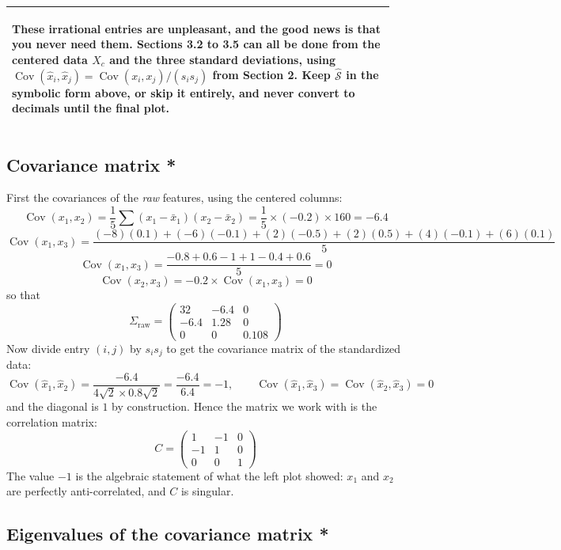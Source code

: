 \documentclass[]{article}
\makeatletter
\newcommand{\Cov}{\operatorname{Cov}}
\newenvironment{simplify}{%
	\par\medskip\noindent
	\begin{tabular}{@{}p{0.965\linewidth}@{}}
		\hline\rule{0pt}{2.6ex}\itshape
}{%
		\\[0.6ex]\hline
	\end{tabular}
	\par\medskip
}
\makeatother
\begin{document}
	\begin{simplify}
		These irrational entries are unpleasant, and the good news is that \textbf{you never need them}.
		Sections 3.2 to 3.5 can all be done from the centered data $X_c$ and the three standard deviations, using $\Cov(\hat{x}_i, \hat{x}_j) = \Cov(x_i, x_j) / (s_i s_j)$ from Section 2.
		Keep $\hat{\mathcal{S}}$ in the symbolic form above, or skip it entirely, and never convert to decimals until the final plot.
	\end{simplify}

	\subsection{Covariance matrix *}

	First the covariances of the \emph{raw} features, using the centered columns:
	$$
	\Cov(x_1, x_2) = \frac{1}{5} \sum (x_1 - \bar{x}_1)(x_2 - \bar{x}_2)
	= \frac{1}{5} \times (-0.2) \times 160 = -6.4
	$$
	$$
	\Cov(x_1, x_3) = \frac{(-8)(0.1) + (-6)(-0.1) + (2)(-0.5) + (2)(0.5) + (4)(-0.1) + (6)(0.1)}{5}
	$$
	$$
	\Cov(x_1, x_3) = \frac{-0.8 + 0.6 - 1 + 1 - 0.4 + 0.6}{5} = 0
	$$
	$$
	\Cov(x_2, x_3) = -0.2 \times \Cov(x_1, x_3) = 0
	$$
	so that
	$$
	\Sigma_{\text{raw}} =
	\begin{pmatrix}
		32 & -6.4 & 0 \\
		-6.4 & 1.28 & 0 \\
		0 & 0 & 0.108
	\end{pmatrix}
	$$
	Now divide entry $(i,j)$ by $s_i s_j$ to get the covariance matrix of the standardized data:
	$$
	\Cov(\hat{x}_1, \hat{x}_2) = \frac{-6.4}{4\sqrt{2} \times 0.8\sqrt{2}} = \frac{-6.4}{6.4} = -1,
	\qquad
	\Cov(\hat{x}_1, \hat{x}_3) = \Cov(\hat{x}_2, \hat{x}_3) = 0
	$$
	and the diagonal is $1$ by construction.
	Hence the matrix we work with is the correlation matrix:
	$$
	C =
	\begin{pmatrix}
		1 & -1 & 0 \\
		-1 & 1 & 0 \\
		0 & 0 & 1
	\end{pmatrix}
	$$
	The value $-1$ is the algebraic statement of what the left plot showed: $x_1$ and $x_2$ are perfectly anti-correlated, and $C$ is singular.

	\subsection{Eigenvalues of the covariance matrix *}
\end{document}
